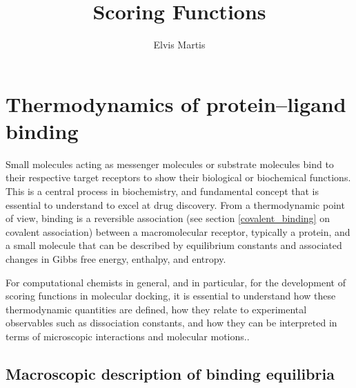 \documentclass[12pt]{article}
\begin{document}
\title{Scoring Functions}
\author{Elvis Martis}
\date{}
\maketitle

\section{Thermodynamics of protein--ligand binding}

Small molecules acting as messenger molecules or substrate molecules bind to their respective target receptors to show their biological or biochemical functions. This is a central process in biochemistry, and fundamental concept that is essential to understand to excel at drug discovery. From a thermodynamic point of view, binding is a reversible association (see section \ref{covalent_binding} on covalent association) between a macromolecular receptor, typically a protein, and a small molecule that can be described by equilibrium constants and associated changes in Gibbs free energy, enthalpy, and entropy.\cite{CH3_DillBromberg,CH3_AtkinsDePaula} 

For computational chemists in general, and in particular, for the development of scoring functions in molecular docking, it is essential to understand how these thermodynamic quantities are defined, how they relate to experimental observables such as dissociation constants, and how they can be interpreted in terms of microscopic interactions and molecular motions.\cite{CH3_GilsonZhou2007}.


\subsection{Macroscopic description of binding equilibria}
\end{document}

